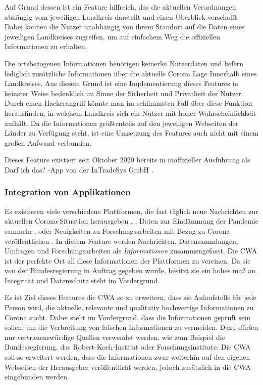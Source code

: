\documentclass[conference,compsoc]{IEEEtran}
\begin{document}
Auf Grund dessen ist ein Feature hilfreich, das die aktuellen Verordnungen abhängig vom jeweiligen Landkreis darstellt und einen Überblick verschafft.
Dabei können die Nutzer unabhängig von ihrem Standort auf die Daten eines jeweiligen Landkreises zugreifen,
um auf einfachem Weg die offiziellen Informationen zu erhalten. 

Die ortsbezogenen Informationen benötigen keinerlei Nutzerdaten und liefern lediglich zusätzliche Informationen über die aktuelle Corona Lage Innerhalb eines Landkreises.
Aus diesem Grund ist eine Implementierung dieses Features in keinster Weise bedenklich im Sinne der Sicherheit und Privatheit der Nutzer.
Durch einen Hackerangriff könnte man im schlimmsten Fall über diese Funktion herausfinden, in welchem Landkreis sich ein Nutzer mit hoher Wahrscheinlichkeit aufhält.
Da die Informationen größtenteils auf den jeweiligen Webseiten der Länder zu Verfügung steht, ist eine Umsetzung des Features auch nicht mit einem großen Aufwand verbunden.  

Dieses Feature existiert seit Oktober 2020 bereits in inoffizieller Ausführung als \glqq Darf ich das?\grqq{} -App von der InTradeSys GmbH \cite{DarfIchDas}.\\

\subsubsection{Integration von Applikationen}
Es existieren viele verschiedene Plattformen, die fast täglich neue Nachrichten zur aktuellen Corona-Situation herausgeben \cite{RKI}, \cite{BMG}, Daten zur Eindämmung der Pandemie sammeln \cite{RKIDatenspende}, \cite{Gedaechtnistest} oder Neuigkeiten zu Forschungsarbeiten mit Bezug zu Corona veröffentlichen \cite{GesundheitsforschungNews}.
In diesem Feature werden Nachrichten, Datensammlungen, Umfragen und Forschungsarbeiten als \textit{Informationen} zusammengefasst.
Die CWA ist der perfekte Ort all diese Informationen der Plattformen zu vereinen. 
Da sie von der Bundesregierung in Auftrag gegeben wurde, besitzt sie ein hohes maß an Integrität und Datenschutz steht im Vordergrund.

Es ist Ziel dieses Features die CWA so zu erweitern, dass sie Anlaufstelle für jede Person wird, die aktuelle, relevante und qualitativ hochwertige Informationen zu Corona sucht.
Dabei steht im Vordergrund, dass die Informationen geprüft sein sollen, um die Verbreitung von falschen Informationen zu vermeiden. 
Dazu dürfen nur vertrauenswürdige Quellen verwendet werden, wie zum Beispiel die Bundesregierung, das Robert-Koch-Institut oder Forschungsinstitute. 
Die CWA soll so erweitert werden, dass die Informationen zwar weiterhin auf den eigenen Webseiten der Herausgeber veröffentlicht werden, jedoch zusätzlich in die CWA eingebunden werden.
\end{document}
